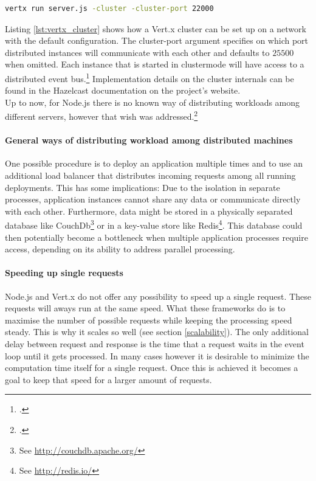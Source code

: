 \begin{lstlisting}[language=bash,caption={Starting a vert.x application in cluster mode},label={lst:vertx_cluster}]
vertx run server.js -cluster -cluster-port 22000
\end{lstlisting}

Listing \ref{lst:vertx_cluster} shows how a Vert.x cluster can be set up on a
network with the default configuration. The cluster-port argument specifies on
which port distributed instances will communicate with each other and defaults
to $25500$ when omitted.
Each instance that is started in clustermode will have access to a distributed
event bus.\footcite[Cf.][]{vertx_2012} Implementation details on the cluster
internals can be found in the Hazelcast documentation on the project's
website.\\

Up to now, for Node.js there is no known way of distributing workloads among different servers, however that wish was addressed.\footcite[Cf.][]{node_clusterserver}


\paragraph{General ways of distributing workload among distributed machines}
One possible procedure is to deploy an application multiple times and to use an additional load balancer that
distributes incoming requests among all running deployments. This has some
implications: Due to the isolation in separate processes, application instances cannot share any
data or communicate directly with each other.
Furthermore, data might be stored in a physically separated database like CouchDb\footnote{See
\url{http://couchdb.apache.org/}} or in a key-value store like Redis\footnote{See
\url{http://redis.io/}}. This database could then potentially become a bottleneck when multiple application
processes require access, depending on its ability to address parallel processing.

\paragraph{Speeding up single requests}
Node.js and Vert.x do not offer any possibility to speed up a single request.
These requests will aways run at the same speed. What these frameworks do is to
maximise the number of possible requests while keeping the processing speed
steady. This is why it scales so well (see section \ref{scalability}). The only
additional delay between request and response is the time that a request waits
in the event loop until it gets processed.  In many cases however it is
desirable to minimize the computation time itself for a single request. Once
this is achieved it becomes a goal to keep that speed for a larger amount of
requests.\\



